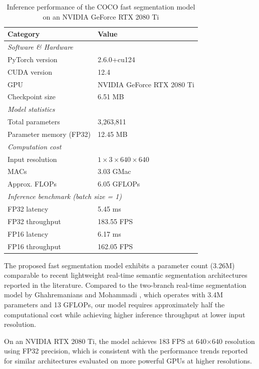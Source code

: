 \documentclass{ieeeaccess}
\begin{document}
\begin{table}[h]
\centering
\caption{Inference performance of the COCO fast segmentation model on an NVIDIA GeForce RTX 2080 Ti}
\label{tab:seg_benchmark_2080ti}
\begin{tabular}{ll}
\hline
\textbf{Category} & \textbf{Value} \\
\hline
\multicolumn{2}{l}{\textit{Software \& Hardware}} \\
PyTorch version & 2.6.0+cu124 \\
CUDA version & 12.4 \\
GPU & NVIDIA GeForce RTX 2080 Ti \\
Checkpoint size & 6.51 MB \\
\hline
\multicolumn{2}{l}{\textit{Model statistics}} \\
Total parameters & 3,263,811 \\
Parameter memory (FP32) & 12.45 MB \\
\hline
\multicolumn{2}{l}{\textit{Computation cost}} \\
Input resolution & $1 \times 3 \times 640 \times 640$ \\
MACs & 3.03 GMac \\
Approx. FLOPs & 6.05 GFLOPs \\
\hline
\multicolumn{2}{l}{\textit{Inference benchmark (batch size = 1)}} \\
FP32 latency & 5.45 ms \\
FP32 throughput & 183.55 FPS \\
FP16 latency & 6.17 ms \\
FP16 throughput & 162.05 FPS \\
\hline
\end{tabular}
\end{table}
The proposed fast segmentation model exhibits a parameter count (3.26M) comparable to recent lightweight real-time semantic segmentation architectures reported in the literature. Compared to the two-branch real-time segmentation model by Ghahremanians and Mohammadi \cite{pathfinding2025}, which operates with 3.4M parameters and 13 GFLOPs, our model requires approximately half the computational cost while achieving higher inference throughput at lower input resolution.

On an NVIDIA RTX 2080 Ti, the model achieves 183 FPS at 640×640 resolution using FP32 precision, which is consistent with the performance trends reported for similar architectures evaluated on more powerful GPUs at higher resolutions.
\end{document}
